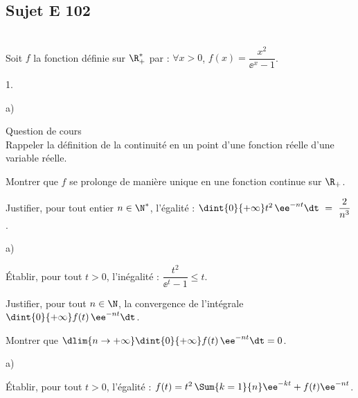 \documentclass[11pt]{article}%
\begin{document}



\subsection*{Sujet E 102}


\begin{exerciceAP}~\\
  Soit $f$ la fonction définie sur $\R_+^*$ par : $\forall x>0$, 
  $f(x) = \dfrac{x^2}{\ee^x -1}$.
  \begin{noliste}{1.}
    \setlength{\itemsep}{2mm}
    \item 
    \begin{noliste}{a)}
    \setlength{\itemsep}{2mm}
      \item Question de cours\\
      Rappeler la définition de la continuité en un point d'une fonction
      réelle d'une variable réelle.
      
      \item Montrer que $f$ se prolonge de manière unique en une 
      fonction continue sur $\R_+$.
    \end{noliste}
    
  \item Justifier, pour tout entier $n\in \N^*$, l'égalité :
    $\dint{0}{+\infty} t^2 \, \ee^{-nt} \dt \ = \ \dfrac{2}{n^3}$.
    
    \item 
    \begin{noliste}{a)}
    \setlength{\itemsep}{2mm}
      \item Établir, pour tout $t>0$, l'inégalité : $\dfrac{t^2}
      {\ee^t -1} \leq t$.
      
      \item Justifier, pour tout $n\in \N$, la convergence de 
      l'intégrale $\dint{0}{+\infty} f(t) \, \ee^{-nt} \dt$.
      
      \item Montrer que $\dlim{n\to +\infty} \dint{0}{+\infty}
      f(t) \, \ee^{-nt} \dt = 0$.
    \end{noliste}
    
    \item 
    \begin{noliste}{a)}
    \setlength{\itemsep}{2mm}
      \item Établir, pour tout $t>0$, l'égalité : $f(t) = t^2 \, 
      \Sum{k=1}{n} \ee^{-kt} + f(t) \ee^{-nt}$.
      

\end{noliste}
\end{noliste}
\end{exerciceAP}
\end{document}
